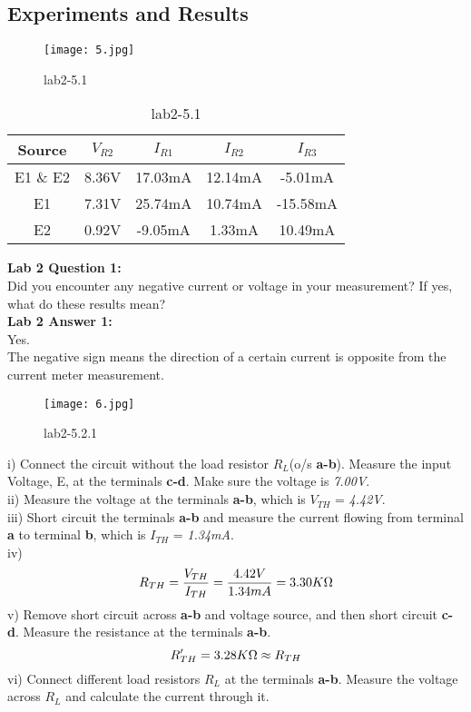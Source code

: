 \documentclass[12pt,fleqn]{article}
\begin{document}
\subsection{Experiments and Results}

\begin{figure}[H]
\centering
\texttt{[image: 5.jpg]}
\caption{lab2-5.1}
\end{figure}


\begin{table}[H]
  \centering
  \begin{tabular}{| c | c | c | c | c |}
    \hline
    \textbf{Source} & \textbf{$V_{R2}$} & \textbf{$I_{R1}$} & \textbf{$I_{R2}$} & \textbf{$I_{R3}$} \\
    \hline
    E1 \& E2 & 8.36V & 17.03mA & 12.14mA & -5.01mA \\
    \hline
    E1 & 7.31V & 25.74mA & 10.74mA & -15.58mA \\ 
    \hline
    E2 & 0.92V & -9.05mA & 1.33mA & 10.49mA \\
    \hline
  \end{tabular}
  \caption{lab2-5.1}
\end{table}
\textbf{Lab 2 Question 1:}
\\Did you encounter any negative current or voltage in your measurement? If yes, what do these results mean?\\
\textbf{Lab 2 Answer 1:}
\\Yes.\\
The negative sign means the direction of a certain current is opposite from the current meter measurement. 

\begin{figure}[H]
\centering
\texttt{[image: 6.jpg]}
\caption{lab2-5.2.1}
\end{figure}
i) Connect the circuit without the load resistor $R_L$(o/s \textbf{a-b}). Measure the input Voltage, E, at the terminals \textbf{c-d}. Make sure the voltage is \emph{7.00V}.\\
ii) Measure the voltage at the terminals \textbf{a-b}, which is $V_{TH}$ = \emph{4.42V}.\\
iii) Short circuit the terminals \textbf{a-b} and measure the current flowing from terminal \textbf{a} to terminal \textbf{b}, which is $I_{TH}$ = \emph{1.34mA}.\\
iv)
\begin{equation}\\R_{TH} = \frac{V_{TH}}{I_{TH}} = \frac{4.42V}{1.34mA} = 3.30K\ensuremath{\Omega}\end{equation}
v) Remove short circuit across \textbf{a-b} and voltage source, and then short circuit \textbf{c-d}. Measure the resistance at the terminals \textbf{a-b}.
\begin{equation}
\\R^\prime_{TH} = 3.28K\Omega \approx R_{TH}
\end{equation}
vi) Connect different load resistors $R_L$ at the terminals \textbf{a-b}. Measure the voltage across $R_L$ and calculate the current through it.
\end{document}
